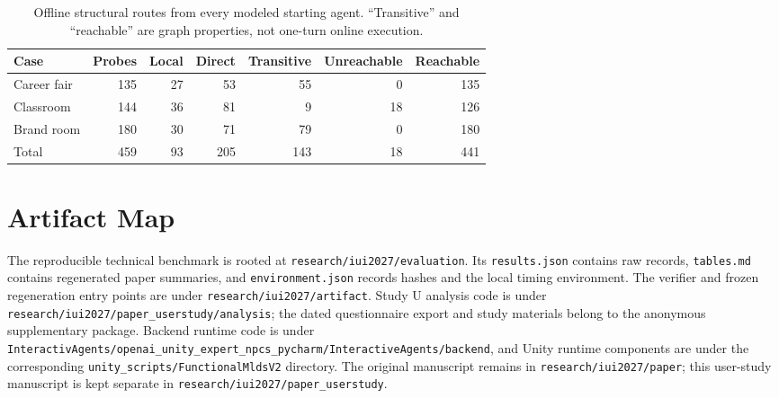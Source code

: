 \begin{table}[h]
  \caption{Offline structural routes from every modeled starting agent.
  ``Transitive'' and ``reachable'' are graph properties, not one-turn online
  execution.}
  \label{tab:per-case-routing}
  \small
  \begin{tabular}{@{}lrrrrrr@{}}
    \toprule
    Case & Probes & Local & Direct & Transitive & Unreachable & Reachable \\
    \midrule
    Career fair & 135 & 27 & 53 & 55 & 0 & 135 \\
    Classroom & 144 & 36 & 81 & 9 & 18 & 126 \\
    Brand room & 180 & 30 & 71 & 79 & 0 & 180 \\
    \midrule
    Total & 459 & 93 & 205 & 143 & 18 & 441 \\
    \bottomrule
  \end{tabular}
\end{table}
\FloatBarrier

\section{Artifact Map}
\label{app:artifact-map}

The reproducible technical benchmark is rooted at
\texttt{research/iui2027/evaluation}.  Its \texttt{results.json} contains raw
records, \texttt{tables.md} contains regenerated paper summaries, and
\texttt{environment.json} records hashes and the local timing environment.
The verifier and frozen regeneration entry points are under
\texttt{research/iui2027/artifact}.  Study U analysis code is under
\texttt{research/iui2027/paper\_userstudy/analysis}; the dated questionnaire
export and study materials belong to the anonymous supplementary package.
Backend runtime code is under
\texttt{InteractivAgents/openai\_unity\_expert\_npcs\_pycharm/InteractiveAgents/backend},
and Unity runtime components are under the corresponding
\texttt{unity\_scripts/FunctionalMldsV2} directory.  The original manuscript
remains in \texttt{research/iui2027/paper}; this user-study manuscript is kept
separate in \texttt{research/iui2027/paper\_userstudy}.
